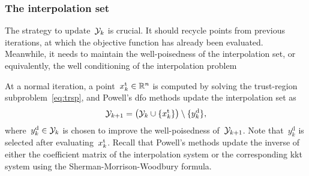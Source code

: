 \documentclass[
    smallextended,  %
    draft,          %
]{svjour3}
\newcommand{\R}{\mathbb{R}}
\newcommand{\drop}{{\text{d}}}
\newcommand{\iter}[1][k]{x\ifthenelse{\equal{#1}{}}{}{_{#1}}}
\newcommand{\set}[2][]{#1\{#2#1\}}
\newcommand{\trust}{{\text{t}}}
\newcommand{\xpt}[1][k]{\mathcal{Y}\ifthenelse{\equal{#1}{}}{}{_{#1}}}
\begin{document}
\subsubsection{The interpolation set}
\label{ssec:iptset}

The strategy to update~$\xpt$ is crucial.
It should recycle points from previous iterations, at which the objective function has already been evaluated.
Meanwhile, it needs to maintain the well-poisedness of the interpolation set, or equivalently, the well conditioning of the interpolation problem~\cite{Sauer_Xu_1995,Conn_Scheinberg_Vicente_2009b}

At a normal iteration, a point~$\iter^{\trust} \in \R^n$ is computed by solving the trust-region subproblem~\eqref{eq:trsp}, and Powell's \gls{dfo} methods update the interpolation set as
\begin{equation*}
    \xpt[k + 1] = \big(\xpt \cup \set{\iter^{\trust}}\big) \setminus \set{y_k^{\drop}},
\end{equation*}
where~$y_k^{\drop} \in \xpt$ is chosen to improve the well-poisedness of~$\xpt[k + 1]$.
Note that~$y_k^{\drop}$ is selected after evaluating~$\iter^{\trust}$.
Recall that Powell's methods update the inverse of either the coefficient matrix of the
interpolation system or the corresponding \gls{kkt} system using the Sherman-Morrison-Woodbury formula.
\end{document}
